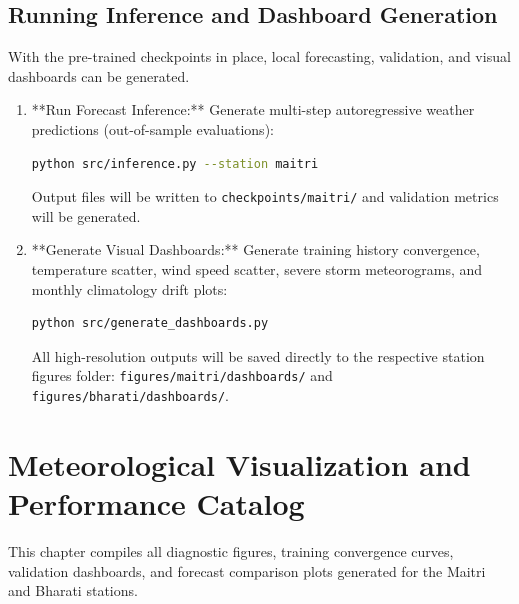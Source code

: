\documentclass[12pt,titlepage,a4paper]{report}
\begin{document}
\section{Running Inference and Dashboard Generation}
With the pre-trained checkpoints in place, local forecasting, validation, and visual dashboards can be generated.
\begin{enumerate}
    \item **Run Forecast Inference:** Generate multi-step autoregressive weather predictions (out-of-sample evaluations):
    \begin{lstlisting}[language=bash, caption=Running Autoregressive Forecast Inference]
python src/inference.py --station maitri
    \end{lstlisting}
    Output files will be written to \texttt{checkpoints/maitri/} and validation metrics will be generated.
    \item **Generate Visual Dashboards:** Generate training history convergence, temperature scatter, wind speed scatter, severe storm meteorograms, and monthly climatology drift plots:
    \begin{lstlisting}[language=bash, caption=Dashboard and Graphs Generation]
python src/generate_dashboards.py
    \end{lstlisting}
    All high-resolution outputs will be saved directly to the respective station figures folder: \texttt{figures/maitri/dashboards/} and \texttt{figures/bharati/dashboards/}.
\end{enumerate}

\chapter{Meteorological Visualization and Performance Catalog}
This chapter compiles all diagnostic figures, training convergence curves, validation dashboards, and forecast comparison plots generated for the Maitri and Bharati stations.
\end{document}
